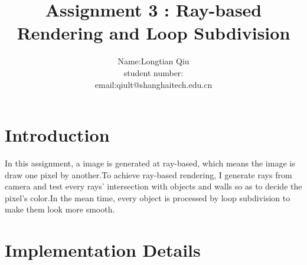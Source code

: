 \documentclass[acmtog]{acmart}
\title{Assignment 3 : Ray-based Rendering and Loop Subdivision}
\author{Name:\quad Longtian Qiu  \\ student number: \quad 2018533107
	\\email:\quad qiult@shanghaitech.edu.cn }
\begin{document}
\maketitle

\vspace*{2 ex}


\section{Introduction}

In this assignment, a image is generated at ray-based, which means the image is draw one pixel by another.To achieve ray-based rendering, I generate rays from camera and test every rays’ intersection with objects and walls so as to decide the pixel’s color.In the mean time, every object is processed by loop subdivision to make them look more smooth.

\section{Implementation Details}
\end{document}
